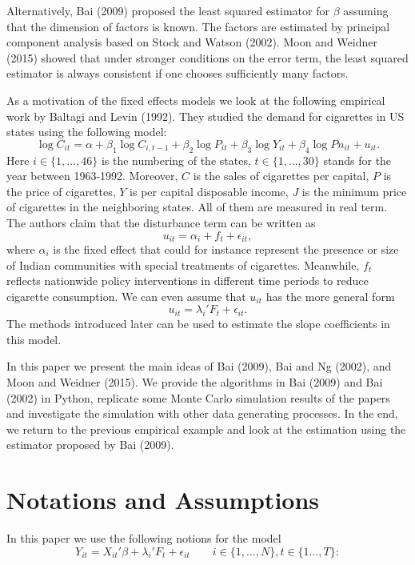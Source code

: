\documentclass[a4paper]{article}
\begin{document}
Alternatively, Bai (2009) proposed the least squared estimator for $\beta$ assuming that the dimension of factors is known. The factors are estimated by principal component analysis based on Stock and Watson (2002). Moon and Weidner (2015) showed that under stronger conditions on the error term, the least squared estimator is always consistent if one chooses sufficiently many factors.

As a motivation of the fixed effects models we look at the following empirical work by Baltagi and Levin (1992). They studied the demand for cigarettes in US states using the following model:
\[
	\log C_{it} =\alpha+\beta_1\log C_{i,t-1}+\beta_2\log P_{it}+\beta_3\log Y_{it}+\beta_4 \log Pn_{it}+u_{it}.
\]
Here $i \in \{1,\ldots, 46\}$ is the numbering of the states, $t \in \{1,\ldots, 30\}$ stands for the year between 1963-1992. Moreover, $C$ is the sales of cigarettes per capital, $P$ is the price of cigarettes, $Y$ is per capital disposable income, $J$ is the minimum price of cigarettes in the neighboring states. All of them are measured in real term. The authors claim that the disturbance term can be written as
\[
	u_{it}=\alpha_i+f_t+\epsilon_{it},
\]
where $\alpha_i$ is the fixed effect that could for instance represent the presence or size of Indian communities with special treatments of cigarettes. Meanwhile, $f_t$ reflects nationwide policy interventions in different time periods to reduce cigarette consumption. We can even assume that $u_{it}$ has the more general form $$u_{it}=\lambda_i'F_t+\epsilon_{it}.$$ The methods introduced later can be used to estimate the slope coefficients in this model.

In this paper we present the main ideas of Bai (2009), Bai and Ng (2002), and Moon and Weidner (2015). We provide the algorithms in Bai (2009) and Bai (2002) in Python, replicate some Monte Carlo simulation results of the papers and investigate the simulation with other data generating processes. In the end, we return to the previous empirical example and look at the estimation using the estimator proposed by Bai (2009).

\section{Notations and Assumptions}
In this paper we use the following notions for the model
$$Y_{it}=X_{it}'\beta+\lambda_i'F_t+\epsilon_{it} \qquad i \in \{1,\ldots,N\}, t\in\{1\ldots, T\}:$$
\end{document}
